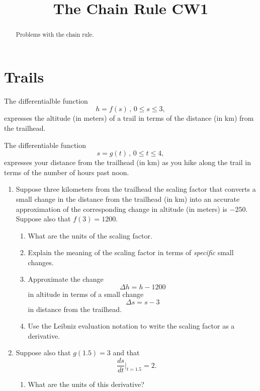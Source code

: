 \documentclass{ximera}
\title{The Chain Rule CW1}
\begin{document}
\begin{abstract}
Problems with the chain rule.
\end{abstract}
\maketitle

\section{Trails}

\begin{question} \label{Q8effrfrf}
The differentialble function
\[
      h = f(s) \, , \, 0\leq s \leq 3 ,
\]
expresses the altitude (in meters) of a trail in terms of the distance (in km) from the trailhead.

The differentiable function
\[
    s = g(t) \, , \, 0\leq t \leq 4,
\]
expresses your distance from the trailhead (in km) as you hike along the trail in terms of the number of hours past noon.

\begin{enumerate}
\item Suppose three kilometers from the trailhead the scaling factor that converts a small change in the distance from the trailhead (in km) into an accurate approximation of the corresponding change in altitude (in meters) is $-250$. Suppose also that $f(3)=1200$.

\begin{enumerate}
\item What are the units of the scaling factor.

\item Explain the meaning of the scaling factor in terms of \emph{specific} small changes.

\item Approximate the change
\[
 \Delta h = h - 1200
\]
in altitude in terms of a small change
\[
  \Delta s = s -3
\]
in distance from the trailhead.

\item Use the Leibniz evaluation notation to write the scaling factor as a derivative.
\end{enumerate}

\item Suppose also that $g(1.5) = 3$ and that
\[
    \frac{ds}{dt} \Big|_{t=1.5} = 2 .
\]

\begin{enumerate}
\item What are the units of this derivative?


\end{enumerate}
\end{enumerate}
\end{question}
\end{document}
